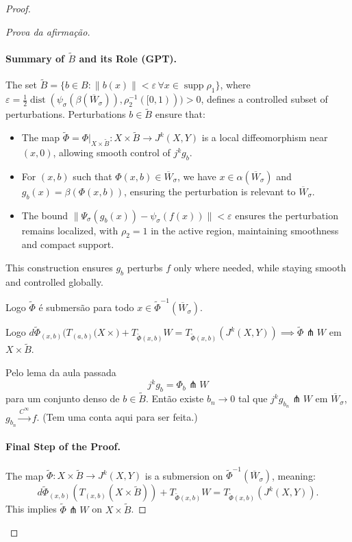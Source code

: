 \begin{proof}
\begin{proof}[Prova da afirmação]
\paragraph{Summary of \(\tilde{B}\) and its Role (GPT).}
The set \(\tilde{B} = \{b \in B : \|b(x)\| < \varepsilon \, \forall x \in \operatorname{supp} \rho_1\}\), where 
\(\varepsilon = \frac{1}{2} \operatorname{dist}(\psi_\sigma(\beta(\overline{W}_\sigma)), \rho_2^{-1}([0,1))) > 0\), defines a controlled subset of perturbations. Perturbations \(b \in \tilde{B}\) ensure that:
\begin{itemize}
    \item The map \(\tilde{\Phi} = \Phi\big|_{X \times \tilde{B}} : X \times \tilde{B} \to J^k(X, Y)\) is a local diffeomorphism near \((x, 0)\), allowing smooth control of \(j^k g_b\).
    \item For \((x, b)\) such that \(\Phi(x, b) \in \overline{W}_\sigma\), we have \(x \in \alpha(\overline{W}_\sigma)\) and \(g_b(x) = \beta(\Phi(x, b))\), ensuring the perturbation is relevant to \(\overline{W}_\sigma\).
    \item The bound \(\|\Psi_\sigma(g_b(x)) - \psi_\sigma(f(x))\| < \varepsilon\) ensures the perturbation remains localized, with \(\rho_2 = 1\) in the active region, maintaining smoothness and compact support.
\end{itemize}
This construction ensures \(g_b\) perturbs \(f\) only where needed, while staying smooth and controlled globally.

Logo \(\tilde{\Phi}\) é submersão para todo \(x \in \tilde{\Phi}^{-1}(\overline{W}_\sigma)\).

Logo \(d \tilde{\Phi}_{(x,b)}(T_{(a,b)}(X \times \Big)+ T_{\tilde{\Phi}(x,b)}W=T_{\tilde{\Phi}(x,b)}(J^k(X,Y)) \implies \tilde{\Phi} \pitchfork W\) em \(X \times \tilde{B}\).

Pelo lema da aula passada
\[j^kg_b=\Phi_b \pitchfork W\]
para um conjunto denso de \(b \in \tilde{ B}\). Então existe \(b_n \to 0\) tal que \(j^k g_{b_n} \pitchfork W\) em \(\overline{W}_\sigma\), \(g_{b_n}\xrightarrow{C^\infty }f\). (Tem uma conta aqui para ser feita.)

\paragraph{Final Step of the Proof.}
The map \(\tilde{\Phi}: X \times \tilde{B} \to J^k(X, Y)\) is a submersion on \(\tilde{\Phi}^{-1}(\overline{W}_\sigma)\), meaning:
\[
d\tilde{\Phi}_{(x,b)}(T_{(x,b)}(X \times \tilde{B})) + T_{\tilde{\Phi}(x,b)}W = T_{\tilde{\Phi}(x,b)}(J^k(X,Y)).
\]
This implies \(\tilde{\Phi} \pitchfork W\) on \(X \times \tilde{B}\).


\end{proof}
\end{proof}
